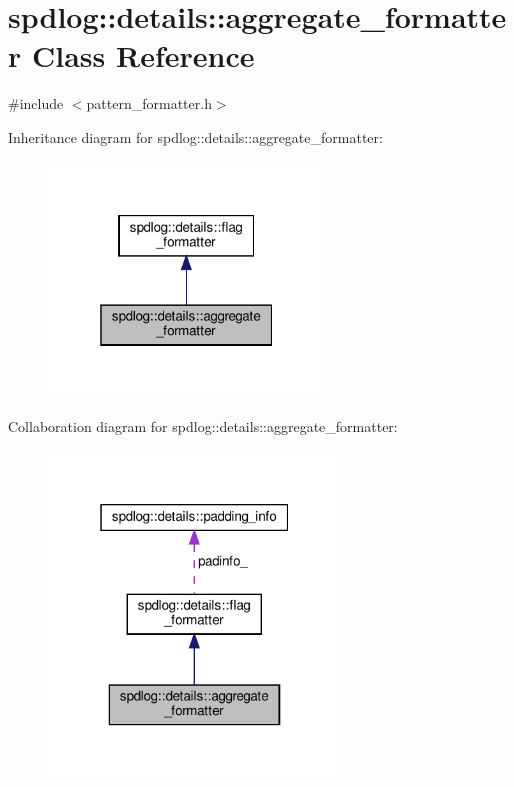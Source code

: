 \hypertarget{classspdlog_1_1details_1_1aggregate__formatter}{}\section{spdlog\+:\+:details\+:\+:aggregate\+\_\+formatter Class Reference}
\label{classspdlog_1_1details_1_1aggregate__formatter}


{\ttfamily \#include $<$pattern\+\_\+formatter.\+h$>$}



Inheritance diagram for spdlog\+:\+:details\+:\+:aggregate\+\_\+formatter\+:
\nopagebreak
\begin{figure}[H]
\begin{center}
\leavevmode
\includegraphics[width=208pt]{classspdlog_1_1details_1_1aggregate__formatter__inherit__graph}
\end{center}
\end{figure}


Collaboration diagram for spdlog\+:\+:details\+:\+:aggregate\+\_\+formatter\+:
\nopagebreak
\begin{figure}[H]
\begin{center}
\leavevmode
\includegraphics[width=220pt]{classspdlog_1_1details_1_1aggregate__formatter__coll__graph}
\end{center}
\end{figure}
